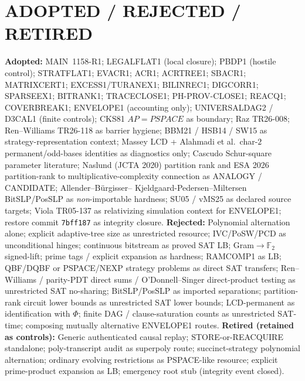 \documentclass[11pt]{article}
\begin{document}
\section*{ADOPTED / REJECTED / RETIRED}
\textbf{Adopted:} MAIN~1158-R1; LEGALFLAT1 (local closure); PBDP1 (hostile control);
STRATFLAT1; EVACR1; ACR1; ACRTREE1; SBACR1; MATRIXCERT1; EXCESS1/TURANEX1; BILINREC1;
DIGCORR1; SPARSEEX1; BITRANK1; TRACECLOSE1; PH-PROV-CLOSE1; REACQ1; COVERBREAK1;
ENVELOPE1 (accounting only); UNIVERSALDAG2 / D3CAL1 (finite controls);
CKS81 $AP=PSPACE$ as boundary; Raz TR26-008; Ren--Williams TR26-118 as barrier hygiene;
BBM21 / HSB14 / SW15 as strategy-representation context; Massey LCD + Alahmadi et al.\
char-$2$ permanent/odd-bases identities as diagnostics only; Cascudo Schur-square
parameter literature; Naslund (JCTA 2020) partition rank and ESA 2026 partition-rank
to multiplicative-complexity connection as ANALOGY / CANDIDATE; Allender--B\"urgisser--
Kjeldgaard-Pedersen--Miltersen BitSLP/PosSLP as \emph{non}-importable hardness;
SU05 / vMS25 as declared source targets; Viola TR05-137 as relativizing simulation
context for ENVELOPE1; restore commit \texttt{7bff187} as integrity closure.
\textbf{Rejected:} Polynomial alternation alone; explicit adaptive-tree size as unrestricted
resource; IVC/PoSW/PCD as unconditional hinges; continuous bitstream as proved SAT LB;
Gram$\to\mathbb F_2$ signed-lift; prime tags / explicit expansion as hardness;
RAMCOMP1 as LB; QBF/DQBF or PSPACE/NEXP strategy problems as direct SAT transfers;
Ren--Williams / parity-PDT direct sums / O'Donnell--Singer direct-product testing as
unrestricted SAT no-sharing; BitSLP/PosSLP as imported separations; partition-rank
circuit lower bounds as unrestricted SAT lower bounds; LCD-permanent as identification
with $\Phi$; finite DAG / clause-saturation counts as unrestricted SAT-time;
composing mutually alternative ENVELOPE1 routes.
\textbf{Retired (retained as controls):} Generic authenticated causal replay; STORE-or-REACQUIRE
standalone; poly-transcript audit as superpoly route; succinct-strategy polynomial
alternation; ordinary evolving restrictions as PSPACE-like resource; explicit prime-product
expansion as LB; emergency root stub (integrity event closed).
\end{document}
